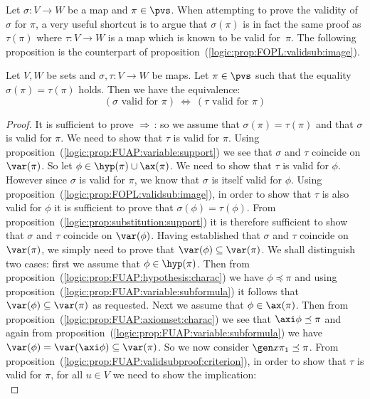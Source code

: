 Let $\sigma:V\to W$ be a map and $\pi\in\pvs$. When attempting to
prove the validity of $\sigma$ for $\pi$, a very useful shortcut is
to argue that $\sigma(\pi)$ is in fact the same proof as $\tau(\pi)$
where $\tau:V\to W$ is a map which is known to be valid for~$\pi$.
The following proposition is the counterpart of
proposition~(\ref{logic:prop:FOPL:validsub:image}).
\begin{prop}\label{logic:prop:FUAP:validsubproof:equal:image}
Let $V,W$ be sets and $\sigma,\tau:V\to W$ be maps. Let $\pi\in\pvs$
such that the equality $\sigma(\pi)=\tau(\pi)$ holds. Then we have
the equivalence:
    \[
    (\mbox{$\sigma$ valid for $\pi$})\ \Leftrightarrow\
    (\mbox{$\tau$ valid for $\pi$})
    \]
\end{prop}
\begin{proof}
It is sufficient to prove $\Rightarrow$\,: so we assume that
$\sigma(\pi)=\tau(\pi)$ and that $\sigma$ is valid for $\pi$. We
need to show that $\tau$ is valid for $\pi$. Using
proposition~(\ref{logic:prop:FUAP:variable:support}) we see that
$\sigma$ and $\tau$ coincide on $\var(\pi)$. So let
$\phi\in\hyp(\pi)\cup\ax(\pi)$. We need to show that $\tau$ is valid
for $\phi$. However since $\sigma$ is valid for $\pi$, we know that
$\sigma$ is itself valid for $\phi$. Using
proposition~(\ref{logic:prop:FOPL:validsub:image}), in order to show
that $\tau$ is also valid for $\phi$ it is sufficient to prove that
$\sigma(\phi)=\tau(\phi)$. From
proposition~(\ref{logic:prop:substitution:support}) it is therefore
sufficient to show that $\sigma$ and $\tau$ coincide on
$\var(\phi)$. Having established that $\sigma$ and $\tau$ coincide
on $\var(\pi)$, we simply need to prove that
$\var(\phi)\subseteq\var(\pi)$. We shall distinguish two cases:
first we assume that $\phi\in\hyp(\pi)$. Then from
proposition~(\ref{logic:prop:FUAP:hypothesis:charac}) we have
$\phi\preceq\pi$ and using
proposition~(\ref{logic:prop:FUAP:variable:subformula}) it follows
that $\var(\phi)\subseteq\var(\pi)$ as requested. Next we assume
that $\phi\in\ax(\pi)$. Then from
proposition~(\ref{logic:prop:FUAP:axiomset:charac}) we see that
$\axi\phi\preceq\pi$ and again from
proposition~(\ref{logic:prop:FUAP:variable:subformula}) we have
$\var(\phi)=\var(\axi\phi)\subseteq\var(\pi)$. So we now consider
$\gen x\pi_{1}\preceq\pi$. From
proposition~(\ref{logic:prop:FUAP:validsubproof:criterion}), in
order to show that $\tau$ is valid for $\pi$, for all $u\in V$ we
need to show the implication:
    \begin{equation}\label{logic:eqn:FUAP:validsub:equal:image:1}

\end{equation}
\end{proof}
